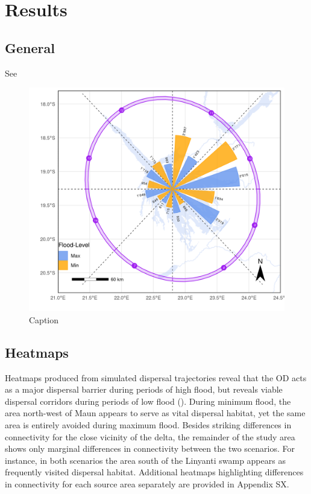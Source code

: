 \documentclass[abstract=on,10pt,a4paper,bibliography=totocnumbered]{article}
\begin{document}
\section{Results}
\subsection{General}
See 
\begin{figure}
  \begin{center}
  \includegraphics[width = \textwidth]{99_Emigration.png}
  \caption{Caption}
  \label{Emigration}
  \end{center}
\end{figure}

\subsection{Heatmaps}
Heatmaps produced from simulated dispersal trajectories reveal that the OD acts
as a major dispersal barrier during periods of high flood, but reveals viable
dispersal corridors during periods of low flood (). During
minimum flood, the area north-west of Maun appears to serve as vital dispersal
habitat, yet the same area is entirely avoided during maximum flood. Besides
striking differences in connectivity for the close vicinity of the delta, the
remainder of the study area shows only marginal differences in connectivity
between the two scenarios. For instance, in both scenarios the area south of the
Linyanti swamp appears as frequently visited dispersal habitat. Additional
heatmaps highlighting differences in connectivity for each source area
separately are provided in Appendix SX.
\end{document}
